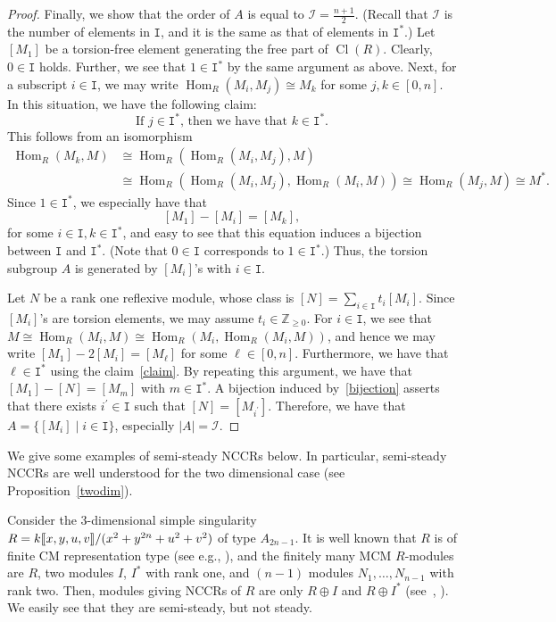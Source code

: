 \documentclass[ALCO,ThmDefs,Unicode]{cedram}
\newcommand{\calI}{\mathcal{I}}
\newcommand{\ZZ}{\mathbb{Z}}
\newcommand{\ttI}{\mathtt{I}}
\DeclareMathOperator{\Hom}{Hom}
\DeclareMathOperator{\Cl}{Cl}
\newcommand{\llbracket}{\mathopen{[\mkern -2.7mu[}}
\newcommand{\rrbracket}{\mathclose{]\mkern -2.7mu]}}
\begin{document}
\begin{proof}
Finally, we show that the order of $A$ is equal to $\calI=\frac{n+1}{2}$. (Recall that $\calI$ is the number of elements in $\ttI$, and it is the same as that of elements in $\ttI^*$.) Let $[M_1]$ be a torsion-free element generating the free part of $\Cl(R)$. Clearly, $0\in \ttI$ holds. Further, we see that $1\in\ttI^*$ by the same argument as above. Next, for a subscript $i\in\ttI$, we may write $\Hom_R(M_i,M_j)\cong M_k$ for some $j, k\in[0,n]$. In this situation, we have the following claim:
\begin{equation}\label{claim}
\text{If $j\in\ttI^*$, then we have that $k\in\ttI^*$}.
\end{equation}
This follows from an isomorphism
\begin{equation*}
\begin{split}
\Hom_R(M_k,M)&\cong\Hom_R(\Hom_R(M_i,M_j),M) \\
&\cong\Hom_R(\Hom_R(M_i,M_j),\Hom_R(M_i,M))\cong\Hom_R(M_j,M)\cong M^*.
\end{split}
\end{equation*}
Since $1\in\ttI^*$, we especially have that
\begin{equation}\label{bijection}
[M_1]-[M_i]=[M_k],
\end{equation}
for some $i\in\ttI, k\in\ttI^*$, and easy to see that this equation induces a bijection between $\ttI$ and $\ttI^*$. (Note that $0\in\ttI$ corresponds to $1\in\ttI^*$.) Thus, the torsion subgroup $A$ is generated by $[M_i]$'s with $i\in\ttI$.

Let $N$ be a rank one reflexive module, whose class is $[N]=\sum_{i\in\ttI}t_i[M_i]$. Since $[M_i]$'s are torsion elements, we may assume $t_i\in\ZZ_{\ge0}$. For $i\in\ttI$, we see that $M\cong\Hom_R(M_i,M)\cong\Hom_R(M_i,\Hom_R(M_i,M))$, and hence we may write $[M_1]-2[M_i]=[M_\ell]$ for some $\ell\in[0,n]$. Furthermore, we have that $\ell\in\ttI^*$ using the claim~\eqref{claim}. By repeating this argument, we have that $[M_1]-[N]=[M_m]$ with $m\in\ttI^*$. A bijection induced by~\eqref{bijection} asserts that there exists $i^\prime\in\ttI$ such that $[N]=[M_{i^\prime}]$. Therefore, we have that $A=\{[M_i] \mid i\in\ttI \}$, especially $|A|=\calI$.
\end{proof}

We give some examples of semi-steady NCCRs below. In particular, semi-steady NCCRs are well understood for the two dimensional case (see Proposition~\ref{twodim}).

\begin{exem}\label{ex_Ansing}
Consider the $3$-dimensional simple singularity $R=k\llbracket x,y,u,v\rrbracket /(x^2+y^{2n}+u^2+v^2)$ of type $A_{2n-1}$. It is well known that $R$ is of finite CM representation type (see e.g., \cite[Chapter~12]{Yos}), and the finitely many MCM $R$-modules are $R$, two modules $I$, $I^*$ with rank one, and $(n-1)$ modules $N_1,\dots,N_{n-1}$ with rank two. Then, modules giving NCCRs of $R$ are only $R\oplus I$ and $R\oplus I^*$ (see~\cite[Proposition~2.4]{BIKR}, \cite[Example~3.6]{Dao}). We easily see that they are semi-steady, but not steady.
\end{exem}
\end{document}
